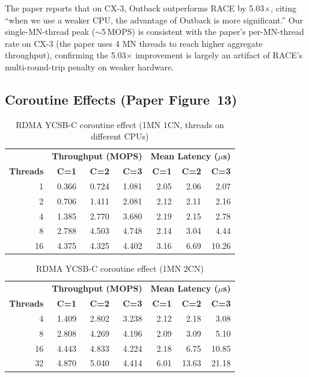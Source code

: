 \documentclass[conference]{IEEEtran}
\begin{document}
The paper reports that on CX-3, Outback outperforms RACE by 5.03$\times$, citing ``when we use a weaker CPU, the advantage of Outback is more significant.'' Our single-MN-thread peak ($\sim$5\,MOPS) is consistent with the paper's per-MN-thread rate on CX-3 (the paper uses 4 MN threads to reach higher aggregate throughput), confirming the 5.03$\times$ improvement is largely an artifact of RACE's multi-round-trip penalty on weaker hardware.

\subsection{Coroutine Effects (Paper Figure~13)}\label{sec:repro-coro}

\begin{table}[H]
\centering
\caption{RDMA YCSB-C coroutine effect (1MN 1CN, threads on different CPUs)}
\label{tab:rdma-coro-1cn}
\small
\begin{tabular}{@{}rrrr|rrr@{}}
\toprule
& \multicolumn{3}{c|}{\textbf{Throughput (MOPS)}} & \multicolumn{3}{c}{\textbf{Mean Latency ($\mu$s)}} \\
\textbf{Threads} & \textbf{C=1} & \textbf{C=2} & \textbf{C=3} & \textbf{C=1} & \textbf{C=2} & \textbf{C=3} \\
\midrule
1  & 0.366 & 0.724 & 1.081 & 2.05 & 2.06 & 2.07 \\
2  & 0.706 & 1.411 & 2.081 & 2.12 & 2.11 & 2.16 \\
4  & 1.385 & 2.770 & 3.680 & 2.19 & 2.15 & 2.78 \\
8  & 2.788 & 4.503 & 4.748 & 2.14 & 3.04 & 4.44 \\
16 & 4.375 & 4.325 & 4.402 & 3.16 & 6.69 & 10.26 \\
\bottomrule
\end{tabular}
\end{table}

\begin{table}[H]
\centering
\caption{RDMA YCSB-C coroutine effect (1MN 2CN)}
\label{tab:rdma-coro-2cn}
\small
\begin{tabular}{@{}rrrr|rrr@{}}
\toprule
& \multicolumn{3}{c|}{\textbf{Throughput (MOPS)}} & \multicolumn{3}{c}{\textbf{Mean Latency ($\mu$s)}} \\
\textbf{Threads} & \textbf{C=1} & \textbf{C=2} & \textbf{C=3} & \textbf{C=1} & \textbf{C=2} & \textbf{C=3} \\
\midrule
4  & 1.409 & 2.802 & 3.238 & 2.12 & 2.18 & 3.08 \\
8  & 2.808 & 4.269 & 4.196 & 2.09 & 3.09 & 5.10 \\
16 & 4.443 & 4.833 & 4.224 & 2.18 & 6.75 & 10.85 \\
32 & 4.870 & 5.040 & 4.414 & 6.01 & 13.63 & 21.18 \\
\bottomrule
\end{tabular}
\end{table}
\end{document}
